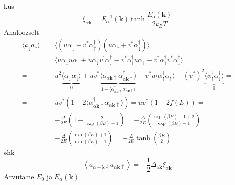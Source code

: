 \documentclass[class=article, crop=false]{standalone}
\begin{document}
kus
\begin{equation}\label{key}
	\xi_{ \alpha \mathbf{k}} = E_{ \alpha}^{-1} ( \mathbf{k}) \tanh \frac{E_{ \alpha} ( \mathbf{k})}{2 k_{B} T}
\end{equation}
Analoogselt
\begin{equation}\label{key}
	\begin{split}
		\langle a_{ \downarrow} a_{ \uparrow} \rangle = & \langle (u \alpha_{ \downarrow} - v^{ \ast} \alpha_{ \uparrow}^{ \dagger}) (u \alpha_{ \uparrow} + v^{ \ast} \alpha_{ \downarrow}^{ \dagger}) \rangle = \\
		= & \langle u \alpha_{ \downarrow} u \alpha_{ \uparrow} + u \alpha_{ \downarrow} v^{ \ast} \alpha_{ \downarrow}^{ \dagger} - v^{ \ast} \alpha_{ \uparrow}^{ \dagger} u \alpha_{ \uparrow} - v^{ \ast} \alpha_{ \uparrow}^{ \dagger} v^{ \ast} \alpha_{ \downarrow}^{ \dagger} \rangle = \\
		= & u^{2} \underbrace{\langle \alpha_{ \downarrow} \alpha_{ \downarrow} \rangle}_{0} + u v^{ \ast} \underbrace{ \langle \alpha_{ \alpha \mathbf{k} \uparrow} \alpha_{ \alpha \mathbf{k} \uparrow}^{ \dagger} \rangle}_{1 - \langle \alpha_{ \alpha \mathbf{k} \uparrow}^{ \dagger} \alpha_{ \alpha \mathbf{k} \uparrow} \rangle} - v^{ \ast} u \langle \alpha_{ \uparrow}^{ \dagger} \alpha_{ \uparrow} \rangle - (v^{ \ast})^{2} \underbrace{\langle \alpha_{ \uparrow}^{ \dagger} \alpha_{ \downarrow}^{ \dagger} \rangle}_{0} = \\
		= & u v^{ \ast} (1 - 2 \langle \alpha_{ \alpha \mathbf{k} \uparrow}^{ \dagger} \alpha_{ \alpha \mathbf{k} \uparrow} \rangle) = u v^{ \ast} (1 - 2 f(E)) = \\
		= & - \frac{ \Delta}{2 E} \left( 1 - \frac{2}{ \exp ( \beta E) - 1} \right) = - \frac{ \Delta}{2 E} \left( \frac{\exp ( \beta E) - 1 + 2}{ \exp ( \beta E) - 1} \right) = \\
		= & - \frac{ \Delta}{2 E} \left( \frac{\exp ( \beta E) + 1}{ \exp ( \beta E) - 1} \right) = - \frac{ \Delta}{2 E} \tanh \left( \frac{ \beta E}{2} \right) 
	\end{split}
\end{equation}
ehk
\begin{equation}\label{key}
	\left\langle a_{ \alpha -\mathbf{k} \downarrow} a_{ \alpha \mathbf{k} \uparrow} \right\rangle = - \frac{1}{2} \Delta_{ \alpha \mathbf{k}} \xi_{ \alpha \mathbf{k}}
\end{equation}
Arvutame $ E_{0} $ ja $ E_{ \alpha} ( \mathbf{k}) $
\end{document}
